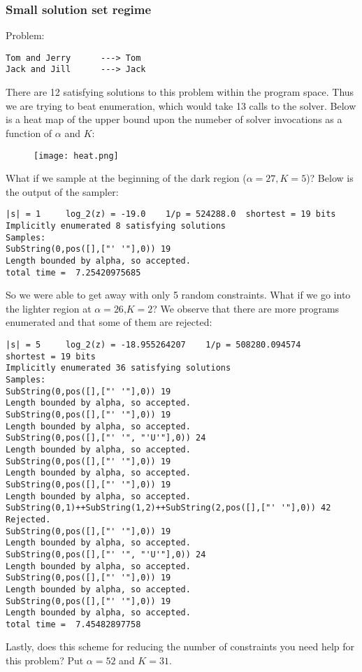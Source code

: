 \documentclass{article}
\begin{document}
\subsubsection{Small solution set regime}
Problem:
\begin{verbatim}
Tom and Jerry      ---> Tom
Jack and Jill      ---> Jack
\end{verbatim}
There are 12 satisfying solutions to this problem within the program space.
Thus we are trying to beat enumeration, which would take 13 calls to the solver.
Below is a heat map of the upper bound upon the numeber of solver invocations as a function of $\alpha$ and $K$:
\begin{figure}
  \texttt{[image: heat.png]}
\end{figure}
What if we sample at the beginning of the dark region ($\alpha = 27,K = 5$)? Below is the output of the sampler:
\begin{verbatim}
|s| = 1 	log_2(z) = -19.0 	1/p = 524288.0 	shortest = 19 bits
Implicitly enumerated 8 satisfying solutions
Samples:
SubString(0,pos([],["' '"],0)) 19
Length bounded by alpha, so accepted.
total time =  7.25420975685
\end{verbatim}
So we were able to get away with only 5 random constraints. What if we go into the lighter region at $\alpha = 26$,$K = 2$? We observe that there are more programs enumerated and that some of them are rejected:
\begin{verbatim}
|s| = 5 	log_2(z) = -18.955264207 	1/p = 508280.094574 	shortest = 19 bits
Implicitly enumerated 36 satisfying solutions
Samples:
SubString(0,pos([],["' '"],0)) 19
Length bounded by alpha, so accepted.
SubString(0,pos([],["' '"],0)) 19
Length bounded by alpha, so accepted.
SubString(0,pos([],["' '", "'U'"],0)) 24
Length bounded by alpha, so accepted.
SubString(0,pos([],["' '"],0)) 19
Length bounded by alpha, so accepted.
SubString(0,pos([],["' '"],0)) 19
Length bounded by alpha, so accepted.
SubString(0,1)++SubString(1,2)++SubString(2,pos([],["' '"],0)) 42
Rejected.
SubString(0,pos([],["' '"],0)) 19
Length bounded by alpha, so accepted.
SubString(0,pos([],["' '", "'U'"],0)) 24
Length bounded by alpha, so accepted.
SubString(0,pos([],["' '"],0)) 19
Length bounded by alpha, so accepted.
SubString(0,pos([],["' '"],0)) 19
Length bounded by alpha, so accepted.
total time =  7.45482897758
\end{verbatim}
Lastly, does this scheme for reducing the number of constraints you need help for this problem?
Put $\alpha = 52$ and $K = 31$.
\end{document}
